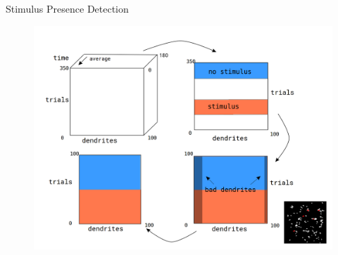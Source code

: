 \documentclass[10pt]{beamer}
\begin{document}
\begin{frame}[fragile]{Stimulus Presence Detection}
\begin{center}
	\begin{figure}
      \includegraphics[width=1.0\textwidth]{data_p.png}
	\end{figure}
	\end{center}
\end{frame}
\end{document}
